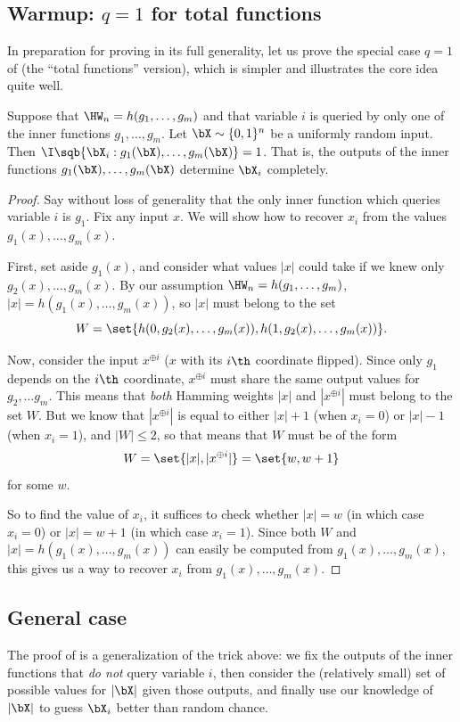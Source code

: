 \subsection{Warmup: $q=1$ for total functions}
In preparation for proving  in its full generality, let us prove the special case $q=1$ of  (the ``total functions'' version), which is simpler and illustrates the core idea quite well.
\begin{proposition}
Suppose that $\HW_n = h(g_1, \ldots, g_m)$ and that variable $i$ is queried by only one of the inner functions $g_1, \ldots, g_m$.
Let $\bX \sim \{0,1\}^n$ be a uniformly random input.
Then $\I\sqb{\bX_i:g_1(\bX), \ldots, g_m(\bX)} = 1$.
That is, the outputs of the inner functions $g_1(\bX), \ldots, g_m(\bX)$ determine $\bX_i$ completely.
\end{proposition}
\begin{proof}
Say without loss of generality that the only inner function which queries variable $i$ is $g_1$.
Fix any input $x$.
We will show how to recover $x_i$ from the values $g_1(x),\ldots, g_m(x)$.

First, set aside $g_1(x)$, and consider what values $|x|$ could take if we knew only $g_2(x), \ldots, g_m(x)$.
By our assumption $\HW_n = h(g_1, \ldots, g_m)$, $|x| = h(g_1(x), \ldots, g_m(x))$, so $|x|$ must belong to the set
\[
W = \set{h(0, g_2(x), \ldots, g_m(x)), h(1, g_2(x), \ldots, g_m(x))}.
\]

Now, consider the input $x^{\oplus i}$ ($x$ with its $i\th$ coordinate flipped).
Since only $g_1$ depends on the $i\th$ coordinate, $x^{\oplus i}$ must share the same output values for $g_2, \ldots g_m$.
This means that \emph{both} Hamming weights $|x|$ and $|x^{\oplus i}|$ must belong to the set $W$.
But we know that $|x^{\oplus i}|$ is equal to either $|x| + 1$ (when $x_i = 0$) or $|x| - 1$ (when $x_i = 1$), and $|W| \leq 2$, so that means that $W$ must be of the form
\[
W = \set{|x|, |x^{\oplus i}|} = \set{w, w+1}
\]
for some $w$.

So to find the value of $x_i$, it suffices to check whether $|x| = w$ (in which case $x_i = 0$) or $|x| = w+1$ (in which case $x_i = 1$).
Since both $W$ and $|x| = h(g_1(x), \ldots, g_m(x))$ can easily be computed from $g_1(x), \ldots, g_m(x)$, this gives us a way to recover $x_i$ from $g_1(x), \ldots, g_m(x)$.
\end{proof}

\subsection{General case}
The proof of  is a generalization of the trick above: we fix the outputs of the inner functions that \emph{do not} query variable $i$,
then consider the (relatively small) set of possible values for $|\bX|$ given those outputs, and finally use our knowledge of $|\bX|$ to guess $\bX_i$ better than random chance.

